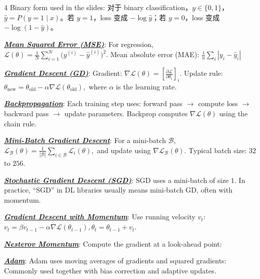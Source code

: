 \documentclass[12pt]{article}
\newcommand{\bulletPoint}[1]{\underline{\textit{\textbf{#1}}}}
\begin{document}
\begin{multicols*}{4}
Binary form used in the slides:
对于 binary classification，$y\in\{0,1\}$，$\hat y=P(y=1\mid x)$。若 $y=1$，loss 变成 $-\log \hat y$；若 $y=0$，loss 变成 $-\log(1-\hat y)$。

\bulletPoint{Mean Squared Error (MSE)}:
For regression,
$\mathcal L(\theta)=\frac{1}{N}\sum_{i=1}^N \bigl(y^{(i)}-\hat y^{(i)}\bigr)^2.$
Mean absolute error (MAE): $\frac{1}{n} \sum_i |y_i - \hat{y}_i|$

\bulletPoint{Gradient Descent (GD)}:
Gradient:
$\nabla \mathcal L(\theta)=\left[\frac{\partial \mathcal L}{\partial \theta_i}\right]_i.$
Update rule:
\textcolor{blue!50!black}{$\textstyle
\theta_{\mathrm{new}}
=
\theta_{\mathrm{old}}
-\alpha \nabla \mathcal L(\theta_{\mathrm{old}}),
$}
where $\alpha$ is the learning rate.

\bulletPoint{Backpropagation}:
Each training step uses:
forward pass $\rightarrow$ compute loss $\rightarrow$ backward pass $\rightarrow$ update parameters.
Backprop computes $\nabla\mathcal L(\theta)$ using the chain rule.

\bulletPoint{Mini-Batch Gradient Descent}:
For a mini-batch $\mathcal B$,
$\mathcal L_{\mathcal B}(\theta)=\frac{1}{|\mathcal B|}\sum_{i\in\mathcal B}\mathcal L_i(\theta),$
and update using $\nabla \mathcal L_{\mathcal B}(\theta).$
Typical batch size: $32$ to $256$.

\bulletPoint{Stochastic Gradient Descent (SGD)}:
SGD uses a mini-batch of size $1$.
In practice, “SGD” in DL libraries usually means mini-batch GD, often with momentum.

\bulletPoint{Gradient Descent with Momentum}:
Use running velocity $v_t$:
\textcolor{purple!60!black}{$\textstyle
v_t=\beta v_{t-1}-\alpha \nabla \mathcal L(\theta_{t-1}),
\theta_t=\theta_{t-1}+v_t.
$}

\bulletPoint{Nesterov Momentum}:
Compute the gradient at a look-ahead point:

\bulletPoint{Adam}:
Adam uses moving averages of gradients and squared gradients:
Commonly used together with bias correction and adaptive updates.


\end{multicols*}
\end{document}
